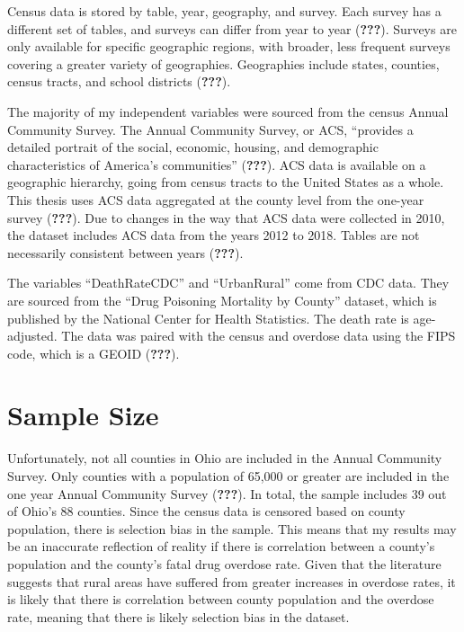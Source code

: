 \documentclass[12pt,twoside]{reedthesis}
\begin{document}
Census data is stored by table, year, geography, and survey. Each survey has a different set of tables, and surveys can differ from year to year ({\textbf{???}}). Surveys are only available for specific geographic regions, with broader, less frequent surveys covering a greater variety of geographies. Geographies include states, counties, census tracts, and school districts ({\textbf{???}}).

The majority of my independent variables were sourced from the census Annual Community Survey. The Annual Community Survey, or ACS, ``provides a detailed portrait of the social, economic, housing, and demographic characteristics of America's communities'' ({\textbf{???}}). ACS data is available on a geographic hierarchy, going from census tracts to the United States as a whole. This thesis uses ACS data aggregated at the county level from the one-year survey ({\textbf{???}}). Due to changes in the way that ACS data were collected in 2010, the dataset includes ACS data from the years 2012 to 2018. Tables are not necessarily consistent between years ({\textbf{???}}).

The variables ``DeathRateCDC'' and ``UrbanRural'' come from CDC data. They are sourced from the ``Drug Poisoning Mortality by County'' dataset, which is published by the National Center for Health Statistics. The death rate is age-adjusted. The data was paired with the census and overdose data using the FIPS code, which is a GEOID ({\textbf{???}}).

\hypertarget{sample-size}{%
\section{Sample Size}\label{sample-size}}

Unfortunately, not all counties in Ohio are included in the Annual Community Survey. Only counties with a population of 65,000 or greater are included in the one year Annual Community Survey ({\textbf{???}}). In total, the sample includes 39 out of Ohio's 88 counties. Since the census data is censored based on county population, there is selection bias in the sample. This means that my results may be an inaccurate reflection of reality if there is correlation between a county's population and the county's fatal drug overdose rate. Given that the literature suggests that rural areas have suffered from greater increases in overdose rates, it is likely that there is correlation between county population and the overdose rate, meaning that there is likely selection bias in the dataset.
\end{document}
